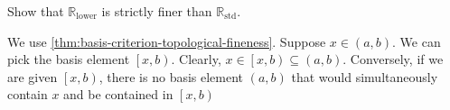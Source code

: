 \begin{exercise}
    Show that \( \mathbb{R}_{\mathrm{lower}} \) is strictly finer than \( \mathbb{R}_{\mathrm{std}} \).
\end{exercise}
\begin{solution}
    We use \cref{thm:basis-criterion-topological-fineness}. Suppose \( x \in \left( a,b \right) \). We can pick the basis element \( \left[ x , b\right) \). Clearly, \( x \in \left[ x,b \right) \subseteq  \left( a,b \right)\). Conversely, if we are given \( \left[ x,b \right) \), there is no basis element \( \left( a,b \right) \) that would simultaneously contain \( x \) and be contained in \( \left[ x,b \right)  \)

\end{solution}
